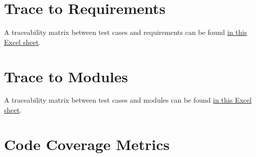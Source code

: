 \documentclass[12pt, titlepage]{article}
\begin{document}
		
\section{Trace to Requirements}

A traceability matrix between test cases and requirements can be found
\href{https://github.com/PlutosCapstone/Plutos/blob/main/docs/VnVPlan/traceability_tests_and_requirements.xlsx}{in
this Excel sheet}.
		
\section{Trace to Modules}		

A traceability matrix between test cases and modules can be found
\href{https://github.com/PlutosCapstone/Plutos/blob/main/docs/VnVReport/requirements_to_modules_traceability.xlsx}{in
this Excel sheet}.

\newpage

\section{Code Coverage Metrics}
\end{document}
